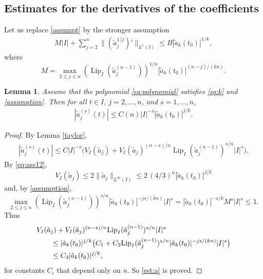 \documentclass[12pt]{amsart}
\theoremstyle{plain}
\newtheorem{lemma}{Lemma}
\theoremstyle{definition}
\numberwithin{equation}{section}
\let\on=\operatorname
\begin{document}
\subsection{Estimates for the derivatives of the coefficients}
Let us replace \eqref{assumpt} by the stronger assumption
\begin{align}\label{assumption}
  {M} |I| + \sum_{j=2}^n \|(\tilde a_j^{1/j})'\|_{L^1 (I)} \le  B |\tilde a_k(t_0)|^{1/k},
\end{align} 
where 
\begin{equation} \label{M}
  {M} = \max_{2 \le j\le n}  ({\on{Lip}}_I(\tilde a_j^{(n-1)}))^{1/n} |\tilde a_k (t_0)|^{(n-j)/(kn)}.
\end{equation}

\begin{lemma} \label{bounds2}
Assume that the polynomial \eqref{eq:polynomial} satisfies \eqref{eq:k} and \eqref{assumption}. 
Then 
for all $t\in I$, 
$ j = 2,\ldots,n$, and  $ s = 1,\ldots,n$,  
    \begin{align}\label{est:a}  
    |\tilde a_j^{(s)}(t) | \le C(n)  |I|^{-s}  |\tilde a_k (t_0)|^{j/k}   .  
  \end{align}
\end{lemma}

\begin{proof}
By Lemma \ref{taylor},    
  \begin{align*}  
    |\tilde a_j^{(s)}(t) | \le C |I|^{-s} \bigl( V_I(\tilde a_j) +  V_I(\tilde a_j)^{(n-s)/n} {\on{Lip}}_I(\tilde a_j^{(n-1)})^{s/n}  |I|^s\bigr).   
  \end{align*}
By \eqref{eq:ass12}, 
\[
  V_I(\tilde a_j) \le 2 \|\tilde a_j\|_{L^{\infty}(I)} \le 2\, (4/3)^n |\tilde a_k (t_0)|^{j/k} 
\]
and, by \eqref{assumption},
\[
   \max_{2 \le j\le n}  ({\on{Lip}}_I(\tilde a_j^{(n-1)}))^{s/n} |\tilde a_k (t_0)|^{-js/(kn)} |I|^s 
   = |\tilde a_k (t_0)|^{-s/k} {M}^s |I|^s \le  1.
\]
Thus 
\begin{align*}
  \MoveEqLeft
  V_I(\tilde a_j) +  V_I(\tilde a_j)^{(n-s)/n} {\on{Lip}}_I(\tilde a_j^{(n-1)})^{s/n}  |I|^s
  \\
  &\le
   |\tilde a_k (t_0)|^{j/k} \big(C_1 + C_2  {\on{Lip}}_I(\tilde a_j^{(n-1)})^{s/n} |\tilde a_k (t_0)|^{-js/(kn)} |I|^s \big) 
  \\
  &\le C_3 |\tilde a_k (t_0)|^{j/k}, 
\end{align*}
for constants $C_i$ that depend only on $n$.
So \eqref{est:a} is proved.  
\end{proof}
\end{document}
